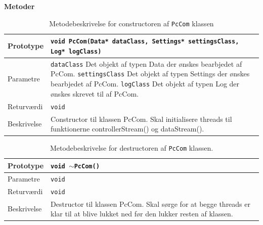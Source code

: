 \clearpage

\textbf{Metoder}

\begin{table}[h]
\begin{tabularx}{\textwidth}{| L{2.5 cm} | Z |} \hline
Prototype 	& \texttt{void PcCom(Data* dataClass, Settings* settingsClass, Log* logClass)} \\\hline
Parametre 	& \texttt{dataClass} 		\newline Det objekt af typen Data der ønskes bearbjedet af PcCom. \newline \newline
			  \texttt{settingsClass} 	\newline Det objekt af typen Settings der ønskes bearbjedet af PcCom. \newline \newline
			  \texttt{logClass}	 		\newline Det objekt af typen Log der ønskes skrevet til af PcCom. \\\hline
Returværdi	& \texttt{void} 			\newline \\\hline
Beskrivelse	& Constructor til klassen PcCom. Skal initialisere threads til funktionerne controllerStream() og dataStream(). \\\hline
\end{tabularx}
\caption{Metodebeskrivelse for constructoren af \texttt{PcCom} klassen}
\label{table:met_pccom}
\end{table}

\begin{table}[h]
\begin{tabularx}{\textwidth}{| L{2.5 cm} | Z |} \hline
Prototype 	& \texttt{void $\sim$PcCom()} \\\hline
Parametre 	& \texttt{void}				\newline \\\hline
Returværdi	& \texttt{void} 			\newline \\\hline
Beskrivelse	& Destructor til klassen PcCom. Skal sørge for at begge threads er klar til at blive lukket ned før den lukker resten af klassen. \\\hline
\end{tabularx}
\caption{Metodebeskrivelse for destructoren af \texttt{PcCom} klassen.}
\label{table:met_pccom_de}
\end{table}

